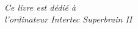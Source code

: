 \begin{titlepage}
\vspace*{\fill}

\begin{flushright}
\emph{Ce livre est dédié à \\
l'ordinateur Intertec Superbrain II}
\end{flushright}

\vspace*{\fill}
\end{titlepage}

